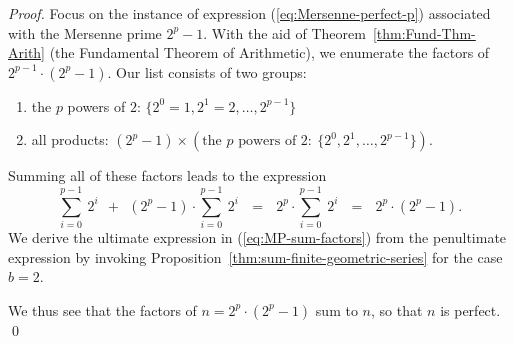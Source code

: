 \begin{proof}
Focus on the instance of expression (\ref{eq:Mersenne-perfect-p}) associated with the Mersenne prime $2^p-1$.  With the aid of Theorem~\ref{thm:Fund-Thm-Arith} (the Fundamental Theorem of
Arithmetic), we enumerate the factors of $2^{p-1} \cdot (2^p-1)$.  Our list consists of two groups:
\begin{enumerate}
\item
the $p$ powers of $2$:  $\{2^0 =1, 2^1 = 2, \ldots, 2^{p-1}\}$
\item
all products: $(2^p-1) \times \left( 
\mbox{the $p$ powers of } 2: \ \{ 2^0, 2^1, \ldots, 2^{p-1}\} \right)$.
\end{enumerate}

\smallskip

\noindent
Summing all of these factors leads to the expression
\begin{equation}
\label{eq:MP-sum-factors}
\sum_{i=0}^{p-1} \ 2^i \ \ + \ \ (2^p-1) \cdot \sum_{i=0}^{p-1} \ 2^i
 \ \ \ = \ \ \  2^p \cdot \sum_{i=0}^{p-1} \ 2^i
 \ \ \ = \ \ \ 2^p \cdot (2^p -1).
\end{equation}
We derive the ultimate expression in (\ref{eq:MP-sum-factors}) from the penultimate expression by invoking Proposition~\ref{thm:sum-finite-geometric-series} for the case $b=2$.

\smallskip

We thus see that the factors of $n = 2^p \cdot (2^p -1)$ sum to $n$, so that $n$ is perfect.  \qed
\end{proof}



%






